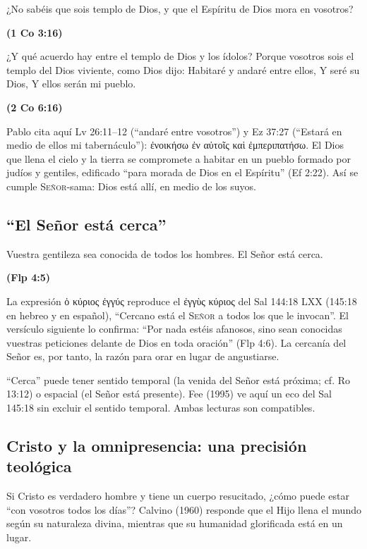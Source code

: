 \documentclass[11pt,letterpaper]{article}
\newcommand{\grc}[1]{\foreignlanguage{ancientgreek}{#1}}
\newcommand{\SENOR}{\textsc{Señor}}
\newcommand{\fuente}[1]{\par\hfill{\upshape\bfseries\small\textcolor{azul}{#1}}}
\begin{document}
\begin{cita}¿No sabéis que sois templo de Dios, y que el Espíritu de Dios mora en vosotros?\fuente{(1 Co 3:16)}\end{cita}
\begin{cita}¿Y qué acuerdo hay entre el templo de Dios y los ídolos? Porque vosotros sois el templo del Dios viviente, como Dios dijo: Habitaré y andaré entre ellos, Y seré su Dios, Y ellos serán mi pueblo.\fuente{(2 Co 6:16)}\end{cita}

Pablo cita aquí Lv 26:11--12 (``andaré entre vosotros'') y Ez 37:27 (``Estará en medio de ellos mi tabernáculo''): \grc{ἐνοικήσω ἐν αὐτοῖς καὶ ἐμπεριπατήσω}. El Dios que llena el cielo y la tierra se compromete a habitar en un pueblo formado por judíos y gentiles, edificado ``para morada de Dios en el Espíritu'' (Ef 2:22). Así se cumple \SENOR{}-sama: Dios está allí, en medio de los suyos.

\subsection{``El Señor está cerca''}

\begin{cita}Vuestra gentileza sea conocida de todos los hombres. El Señor está cerca.\fuente{(Flp 4:5)}\end{cita}

La expresión \grc{ὁ κύριος ἐγγύς} reproduce el \grc{ἐγγὺς κύριος} del Sal 144:18 LXX (145:18 en hebreo y en español), ``Cercano está el \SENOR{} a todos los que le invocan''. El versículo siguiente lo confirma: ``Por nada estéis afanosos, sino sean conocidas vuestras peticiones delante de Dios en toda oración'' (Flp 4:6). La cercanía del Señor es, por tanto, la razón para orar en lugar de angustiarse.

\begin{nota}[Precisión]
``Cerca'' puede tener sentido temporal (la venida del Señor está próxima; cf. Ro 13:12) o espacial (el Señor está presente). Fee (1995) ve aquí un eco del Sal 145:18 sin excluir el sentido temporal. Ambas lecturas son compatibles.
\end{nota}

\subsection{Cristo y la omnipresencia: una precisión teológica}

Si Cristo es verdadero hombre y tiene un cuerpo resucitado, ¿cómo puede estar ``con vosotros todos los días''? Calvino (1960) responde que el Hijo llena el mundo según su naturaleza divina, mientras que su humanidad glorificada está en un lugar.
\end{document}

